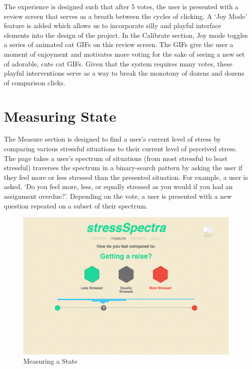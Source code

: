 \documentclass{sigchi}
\begin{document}
The experience is designed such that after 5 votes, the user is presented with a review screen that serves as a breath between the cycles of clicking. A ‘Joy Mode’ feature is added which allows us to incorporate silly and playful interface elements into the design of the project. In the Calibrate section, Joy mode toggles a series of animated cat GIFs on this review screen. The GIFs give the user a moment of enjoyment and motivates more voting for the sake of seeing a new set of adorable, cute cat GIFs. Given that the system requires many votes, these playful interventions serve as a way to break the monotony of dozens and dozens of comparison clicks.

\section{Measuring State}
The Measure section is designed to find a user’s current level of stress by comparing various stressful situations to their current level of perceived stress. The page takes a user’s spectrum of situations (from most stressful to least stressful) traverses the spectrum in a binary-search pattern by asking the user if they feel more or less stressed than the presented situation. For example, a user is asked, ‘Do you feel more, less, or equally stressed as you would if you had an assignment overdue?’. Depending on the vote, a user is presented with a new question repeated on a subset of their spectrum.
\begin{figure}[!h]
\centering
\includegraphics[width=0.9\columnwidth]{measure1}
\caption{Measuring a State}
\label{fig:calibrate}
\end{figure}
\end{document}
